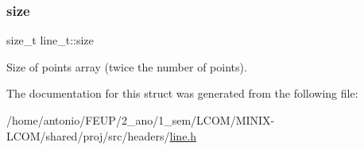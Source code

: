 \subsubsection{\texorpdfstring{size}{size}}
{\footnotesize\ttfamily size\+\_\+t line\+\_\+t\+::size}

Size of points array (twice the number of points). 

The documentation for this struct was generated from the following file\+:\begin{DoxyCompactItemize}
\item 
/home/antonio/\+F\+E\+U\+P/2\+\_\+ano/1\+\_\+sem/\+L\+C\+O\+M/\+M\+I\+N\+I\+X-\/\+L\+C\+O\+M/shared/proj/src/headers/\hyperlink{line_8h}{line.\+h}\end{DoxyCompactItemize}
